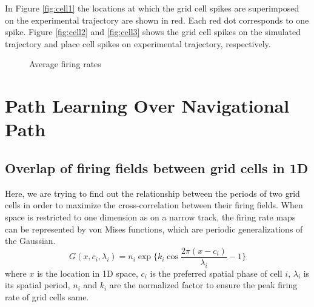 \documentclass[11pt, letterpaper, onecolumn]{article}
\begin{document}
In Figure \ref{fig:cell1} the locations at which the grid cell spikes are superimposed on the experimental trajectory are shown in red. Each red dot corresponds to one spike. Figure \ref{fig:cell2} and \ref{fig:cell3} shows the grid cell spikes on the simulated trajectory and place cell spikes on experimental trajectory, respectively.

\begin{figure}[!htbp]
\centering
{}
\caption{Average firing rates}
\label{fig:cellonpath}
\end{figure}


\section{Path Learning Over Navigational Path}

\subsection{Overlap of firing fields between grid cells in 1D}
Here, we are trying to find out the relationship between the periods of two grid cells in order to maximize the cross-correlation between their firing fields. When space is restricted to one dimension as on a narrow track, the firing rate maps can be represented by von Mises functions, which are periodic generalizations of the Gaussian.
\begin{equation}
    G(x, c_i,\lambda_i) = n_i  \exp\{k_i \cos \frac{2 \pi (x - c_i)}{\lambda_i}-1 \}
\end{equation}
where $x$ is the location in 1D space, $c_i$ is the preferred spatial phase of cell $i$, $\lambda_i$ is its spatial period, $n_i$ and $k_i$ are the normalized factor to ensure the peak firing rate of grid cells same.
\end{document}
